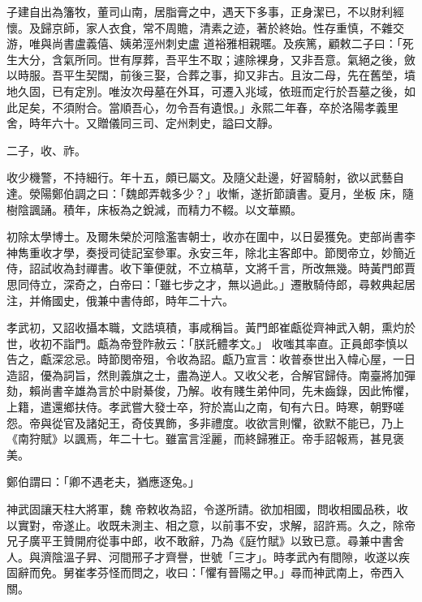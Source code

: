 \begin{pinyinscope}
 子建自出為籓牧，董司山南，居脂膏之中，遇天下多事，正身潔已，不以財利經懷。及歸京師，家人衣食，常不周贍，清素之迹，著於終始。性存重慎，不雜交游，唯與尚書盧義僖、姨弟涇州刺史盧
 道裕雅相親暱。及疾篤，顧敕二子曰：「死生大分，含氣所同。世有厚葬，吾平生不取；遽除裸身，又非吾意。氣絕之後，斂以時服。吾平生契闊，前後三娶，合葬之事，抑又非古。且汝二母，先在舊塋，墳地久固，已有定別。唯汝次母墓在外耳，可遷入兆域，依班而定行於吾墓之後，如此足矣，不須附合。當順吾心，勿令吾有遺恨。」永熙二年春，卒於洛陽孝義里舍，時年六十。又贈儀同三司、定州刺史，謚曰文靜。



 二子，收、祚。



 收少機警，不持細行。年十五，頗已屬文。及隨父赴邊，好習騎射，欲以武藝自達。滎陽鄭伯調之曰：「魏郎弄戟多少？」收慚，遂折節讀書。夏月，坐板
 床，隨樹陰諷誦。積年，床板為之銳減，而精力不輟。以文華顯。



 初除太學博士。及爾朱榮於河陰濫害朝士，收亦在圍中，以日晏獲免。吏部尚書李神雋重收才學，奏授司徒記室參軍。永安三年，除北主客郎中。節閔帝立，妙簡近侍，詔試收為封禪書。收下筆便就，不立槁草，文將千言，所改無幾。時黃門郎賈思同侍立，深奇之，白帝曰：「雖七步之才，無以過此。」遷散騎侍郎，尋敕典起居注，并脩國史，俄兼中書侍郎，時年二十六。



 孝武初，又詔收攝本職，文誥填積，事咸稱旨。黃門郎崔甗從齊神武入朝，熏灼於世，收初不詣門。甗為帝登阼赦云：「朕託體孝文。」
 收嗤其率直。正員郎李慎以告之，甗深忿忌。時節閔帝殂，令收為詔。甗乃宣言：收普泰世出入幃心屋，一日造詔，優為詞旨，然則義旗之士，盡為逆人。又收父老，合解官歸侍。南臺將加彈劾，賴尚書辛雄為言於中尉綦俊，乃解。收有賤生弟仲同，先未齒錄，因此怖懼，上籍，遣還鄉扶侍。孝武嘗大發士卒，狩於嵩山之南，旬有六日。時寒，朝野嗟怨。帝與從官及諸妃王，奇伎異飾，多非禮度。收欲言則懼，欲默不能已，乃上《南狩賦》以諷焉，年二十七。雖富言淫麗，而終歸雅正。帝手詔報焉，甚見褒美。



 鄭伯謂曰：「卿不遇老夫，猶應逐兔。」



 神武固讓天柱大將軍，魏
 帝敕收為詔，令遂所請。欲加相國，問收相國品秩，收以實對，帝遂止。收既未測主、相之意，以前事不安，求解，詔許焉。久之，除帝兄子廣平王贊開府從事中郎，收不敢辭，乃為《庭竹賦》以致已意。尋兼中書舍人。與濟陰溫子昇、河間邢子才齊譽，世號「三才」。時孝武內有間隙，收遂以疾固辭而免。舅崔孝芬怪而問之，收曰：「懼有晉陽之甲。」尋而神武南上，帝西入關。




\end{pinyinscope}

